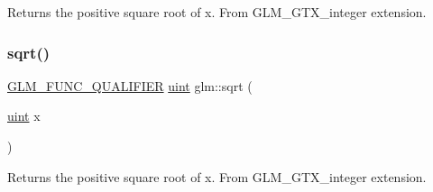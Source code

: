 Returns the positive square root of x. From G\+L\+M\+\_\+\+G\+T\+X\+\_\+integer extension. \mbox{\label{group__gtx__integer_ga457e9efca8339bf918d319e9c55f7c8f}} 
\subsubsection{\texorpdfstring{sqrt()}{sqrt()}\hspace{0.1cm}{\footnotesize\ttfamily [2/2]}}
{\footnotesize\ttfamily \hyperlink{setup_8hpp_a33fdea6f91c5f834105f7415e2a64407}{G\+L\+M\+\_\+\+F\+U\+N\+C\+\_\+\+Q\+U\+A\+L\+I\+F\+I\+ER} \hyperlink{group__core__precision_ga4fd29415871152bfb5abd588334147c8}{uint} glm\+::sqrt (\begin{DoxyParamCaption}\item[{\hyperlink{group__core__precision_ga4fd29415871152bfb5abd588334147c8}{uint}}]{x }\end{DoxyParamCaption})}

Returns the positive square root of x. From G\+L\+M\+\_\+\+G\+T\+X\+\_\+integer extension. 
